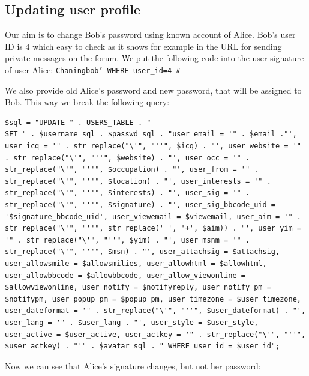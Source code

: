 \documentclass[12pt, a4paper, pdflatex]{article}
\begin{document}
\subsection{Updating user profile}

Our aim is to change Bob's password using known account of Alice. Bob's user ID is 4 which easy to check as it shows for example in the URL for sending private messages on the forum. We put the following code into the user signature of user Alice:
\texttt{Chaningbob' WHERE user\_id=4 \#}

We also provide old Alice's password and new password, that will be assigned to Bob. This way we break the following query:
\lstset{
	captionpos=b,
	frame=single,
	language=PHP,
	breaklines=true,
	label=sql1
}
\begin{lstlisting}
$sql = "UPDATE " . USERS_TABLE . "
SET " . $username_sql . $passwd_sql . "user_email = '" . $email ."', user_icq = '" . str_replace("\'", "''", $icq) . "', user_website = '" . str_replace("\'", "''", $website) . "', user_occ = '" . str_replace("\'", "''", $occupation) . "', user_from = '" . str_replace("\'", "''", $location) . "', user_interests = '" . str_replace("\'", "''", $interests) . "', user_sig = '" . str_replace("\'", "''", $signature) . "', user_sig_bbcode_uid = '$signature_bbcode_uid', user_viewemail = $viewemail, user_aim = '" . str_replace("\'", "''", str_replace(' ', '+', $aim)) . "', user_yim = '" . str_replace("\'", "''", $yim) . "', user_msnm = '" . str_replace("\'", "''", $msn) . "', user_attachsig = $attachsig, user_allowsmile = $allowsmilies, user_allowhtml = $allowhtml, user_allowbbcode = $allowbbcode, user_allow_viewonline = $allowviewonline, user_notify = $notifyreply, user_notify_pm = $notifypm, user_popup_pm = $popup_pm, user_timezone = $user_timezone, user_dateformat = '" . str_replace("\'", "''", $user_dateformat) . "', user_lang = '" . $user_lang . "', user_style = $user_style, user_active = $user_active, user_actkey = '" . str_replace("\'", "''", $user_actkey) . "'" . $avatar_sql . " WHERE user_id = $user_id";
\end{lstlisting}
Now we can see that Alice's signature changes, but not her password:\\
\end{document}
